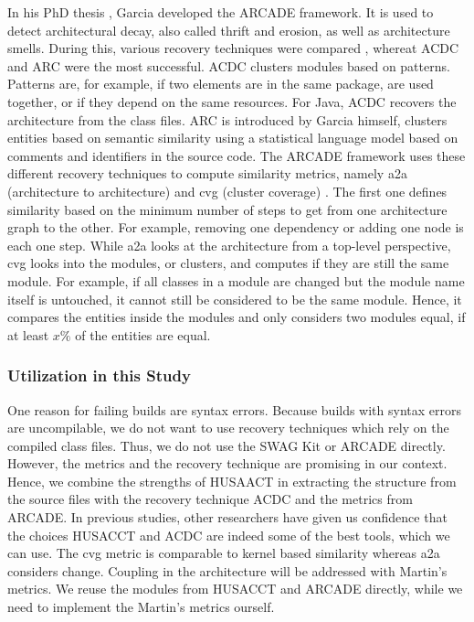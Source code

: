 \documentclass[sigplan, anonymous, review]{acmart}
\begin{document}
In his PhD thesis \cite{arcade-thesis}, Garcia developed the ARCADE framework. It is used to detect architectural decay, also called thrift and erosion, as well as architecture smells. During this, various recovery techniques were compared \cite{arcRec-comparison}, whereat ACDC \cite{ACDC} and ARC were the most successful. 
ACDC clusters modules based on patterns. Patterns are, for example, if two elements are in the same package, are used together, or if they depend on the same resources. For Java, ACDC recovers the architecture from the class files. ARC is introduced by Garcia himself, clusters entities based on semantic similarity using a statistical language model based on comments and identifiers in the source code.
The ARCADE framework uses these different recovery techniques to compute similarity metrics, namely a2a (architecture to architecture) and cvg (cluster coverage) \cite{Arcade}. 
The first one defines similarity based on the minimum number of steps to get from one architecture graph to the other. For example, removing one dependency or adding one node is each one step. While a2a looks at the architecture from a top-level perspective, cvg looks into the modules, or clusters, and computes if they are still the same module. For example, if all classes in a module are changed but the module name itself is untouched, it cannot still be considered to be the same module. Hence, it compares the entities inside the modules and only considers two modules equal, if at least $x \%$ of the entities are equal.

\subsubsection{Utilization in this Study}

One reason for failing builds are syntax errors. Because builds with syntax errors are uncompilable, we do not want to use recovery techniques which rely on the compiled class files. Thus, we do not use the SWAG Kit or ARCADE directly.
However, the metrics and the recovery technique are promising in our context. Hence, we combine the strengths of HUSAACT in extracting the structure from the source files with the recovery technique ACDC and the metrics from ARCADE. 
In previous studies, other researchers \cite{MScSteffen, arcRec-comparison} have given us confidence that the choices HUSACCT and ACDC are indeed some of the best tools, which we can use.
The cvg metric is comparable to kernel based similarity whereas a2a considers change. Coupling in the architecture will be addressed with Martin's metrics. We reuse the modules from HUSACCT and ARCADE directly, while we need to implement the Martin's metrics ourself. 
\end{document}
